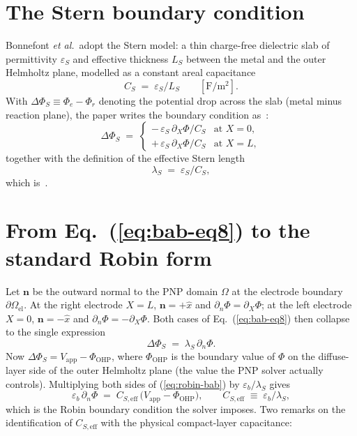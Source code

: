 \documentclass[11pt]{article}
\newcommand{\OHP}{\mathrm{OHP}}
\newcommand{\CS}{C_{\!S}}
\newcommand{\CSeff}{C_{\!S,\mathrm{eff}}}
\newcommand{\eb}{\varepsilon_{b}}
\newcommand{\eS}{\varepsilon_{S}}
\begin{document}
\section{The Stern boundary condition}

Bonnefont \emph{et al.}~adopt the Stern model: a thin charge-free
dielectric slab of permittivity $\eS$ and effective thickness $L_{S}$
between the metal and the outer Helmholtz plane, modelled as a
constant areal capacitance
\begin{equation}
\CS \;=\; \eS / L_{S}\qquad [\mathrm{F/m^{2}}].
\label{eq:cs-defn}
\end{equation}
With $\Delta\Phi_{S}\equiv\Phi_{e}-\Phi_{r}$ denoting the potential
drop across the slab (metal minus reaction plane), the paper writes
the boundary condition as~\cite[Eq.~(8)]{bonnefont2001}:
\begin{equation}
\Delta\Phi_{S}\;=\;
\begin{cases}
-\,\eS\,\partial_{X}\Phi / \CS &\text{at } X=0,\\[2pt]
+\,\eS\,\partial_{X}\Phi / \CS &\text{at } X=L,
\end{cases}
\label{eq:bab-eq8}
\end{equation}
together with the definition of the effective Stern length
\begin{equation}
\lambda_{S}\;=\;\eS/\CS,
\label{eq:lambda-s}
\end{equation}
which is~\cite[Eq.~(9)]{bonnefont2001}.

\section{From \texorpdfstring{Eq.~(\ref{eq:bab-eq8})}{Eq. (8)} to the
standard Robin form}

Let $\mathbf{n}$ be the outward normal to the PNP domain
$\Omega$ at the electrode boundary $\partial\Omega_{\mathrm{el}}$. At
the right electrode $X=L$, $\mathbf{n}=+\hat{x}$ and
$\partial_{n}\Phi=\partial_{X}\Phi$; at the left electrode $X=0$,
$\mathbf{n}=-\hat{x}$ and $\partial_{n}\Phi=-\partial_{X}\Phi$. Both
cases of Eq.~(\ref{eq:bab-eq8}) then collapse to the single
expression
\begin{equation}
\Delta\Phi_{S}\;=\;\lambda_{S}\,\partial_{n}\Phi.
\label{eq:robin-bab}
\end{equation}
Now $\Delta\Phi_{S}=V_{\mathrm{app}}-\Phi_{\OHP}$, where $\Phi_{\OHP}$
is the boundary value of $\Phi$ on the diffuse-layer side of the
outer Helmholtz plane (the value the PNP solver actually controls).
Multiplying both sides of (\ref{eq:robin-bab}) by $\eb/\lambda_{S}$
gives
\begin{equation}
\boxed{\;\;
\eb\,\partial_{n}\Phi \;=\; \CSeff\,
\bigl(V_{\mathrm{app}} - \Phi_{\OHP}\bigr),
\qquad \CSeff \;\equiv\; \eb/\lambda_{S},
\;\;}
\label{eq:our-robin}
\end{equation}
which is the Robin boundary condition the solver imposes.
Two remarks on the identification of $\CSeff$ with the
physical compact-layer capacitance:
\end{document}
